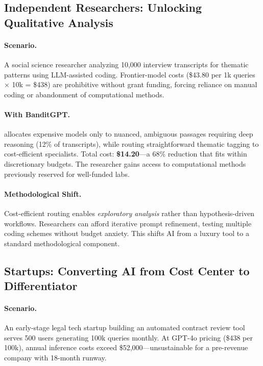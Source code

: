 \subsection{Independent Researchers: Unlocking Qualitative Analysis}

\paragraph{Scenario.} A social science researcher analyzing 10,000 interview transcripts for thematic patterns using LLM-assisted coding. Frontier-model costs (\$43.80 per 1k queries × 10k = \$438) are prohibitive without grant funding, forcing reliance on manual coding or abandonment of computational methods.

\paragraph{With BanditGPT.} \ours{} allocates expensive models only to nuanced, ambiguous passages requiring deep reasoning (12\% of transcripts), while routing straightforward thematic tagging to cost-efficient specialists. Total cost: \textbf{\$14.20}---a 68\% reduction that fits within discretionary budgets. The researcher gains access to computational methods previously reserved for well-funded labs.

\paragraph{Methodological Shift.} Cost-efficient routing enables \emph{exploratory analysis} rather than hypothesis-driven workflows. Researchers can afford iterative prompt refinement, testing multiple coding schemes without budget anxiety. This shifts AI from a luxury tool to a standard methodological component.

\subsection{Startups: Converting AI from Cost Center to Differentiator}

\paragraph{Scenario.} An early-stage legal tech startup building an automated contract review tool serves 500 users generating 100k queries monthly. At GPT-4o pricing (\$438 per 100k), annual inference costs exceed \$52,000---unsustainable for a pre-revenue company with 18-month runway.


